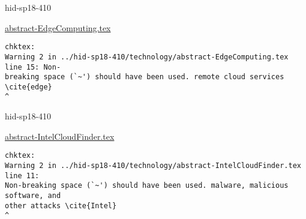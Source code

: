 

\begin{IU}

hid-sp18-410

\href{https://github.com/cloudmesh-community/hid-sp18-410/blob/master//technology/abstract-EdgeComputing.tex}{abstract-EdgeComputing.tex}

\begin{tiny}
\begin{verbatim}
chktex:
Warning 2 in ../hid-sp18-410/technology/abstract-EdgeComputing.tex line 15: Non-
breaking space (`~') should have been used. remote cloud services \cite{edge}
^
\end{verbatim}
\end{tiny}
\end{IU}



\begin{IU}

hid-sp18-410

\href{https://github.com/cloudmesh-community/hid-sp18-410/blob/master//technology/abstract-IntelCloudFinder.tex}{abstract-IntelCloudFinder.tex}

\begin{tiny}
\begin{verbatim}
chktex:
Warning 2 in ../hid-sp18-410/technology/abstract-IntelCloudFinder.tex line 11:
Non-breaking space (`~') should have been used. malware, malicious software, and
other attacks \cite{Intel}                                                 ^
\end{verbatim}
\end{tiny}
\end{IU}



